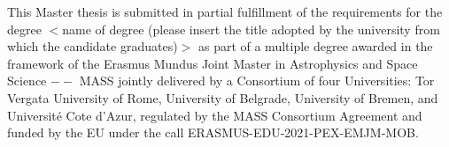 \documentclass[12pt]{article}
\begin{document}
\newpage
\vspace*{\fill}
This Master thesis is submitted in partial fulfillment of the requirements
for the degree $<$name of degree (please insert the title adopted by the
university from which the candidate graduates)$>$ as part of a multiple
degree awarded in the framework of the Erasmus Mundus Joint Master
in Astrophysics and Space Science $--$ MASS jointly delivered by a Consortium of four Universities: Tor Vergata University of Rome, University
of Belgrade, University of Bremen, and Université Cote d'Azur,
regulated by the MASS Consortium Agreement and funded by the EU
under the call ERASMUS-EDU-2021-PEX-EMJM-MOB.
\vspace*{\fill}

\newpage


\newpage
{}











\end{document}
